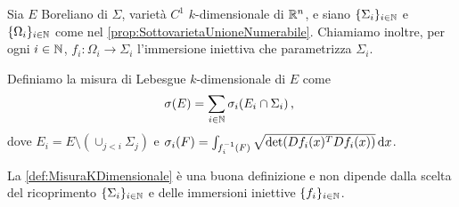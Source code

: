 \begin{definition}\label{def:MisuraKDimensionale}
	Sia $E$ Boreliano di $\Sigma$, varietà $C^1$ $k$-dimensionale di $\mathbb R^n$, e siano $\{\Sigma_i\}_{i\in\mathbb N}$ e $\{\Omega_i\}_{i\in\mathbb N}$ come nel \cref{prop:SottovarietaUnioneNumerabile}. Chiamiamo inoltre, per ogni $i\in\mathbb N$, $f_i:\Omega_i\to\Sigma_i$ l'immersione iniettiva che parametrizza $\Sigma_i$.
	
	Definiamo la misura di Lebesgue $k$-dimensionale di $E$ come
	\begin{equation*}
		\sigma(E)=\sum_{i\in\mathbb N} \sigma_i(E_i\cap \Sigma_i)\, \text{, }
	\end{equation*}
	dove $E_i=E\setminus (\cup_{j<i}\Sigma_j)$ e $\sigma_i(F)=\int_{f_i^{-1}(F)}\sqrt{\det(Df_i(x)^TDf_i(x))} \,\mathrm d x$.
\end{definition}
\begin{theorem}
	La \cref{def:MisuraKDimensionale} è una buona definizione e non dipende dalla scelta del ricoprimento $\{\Sigma_i\}_{i\in\mathbb N}$ e delle immersioni iniettive $\{f_i\}_{i\in\mathbb N}$.
\end{theorem}
